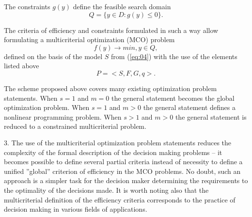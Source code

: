 \documentclass{svproc}
\begin{document}
The constraints $g(y)$ define the feasible search domain 
\begin{equation}
\label{eq:07}
Q=\{ y\in D:g(y) \leq 0 \}.
\end{equation}

The criteria of efficiency and constraints formulated in such a way allow formulating a multicriterial optimization (MCO) problem 
\begin{equation}
\label{eq:08}
f(y) \to min, y \in Q,
\end{equation}
defined on the basis of the model $S$ from (\ref{eq:04}) with the use of the elements listed above 
\begin{equation}
\label{eq:09}
P=<S,F,G,q>.
\end{equation}

The scheme proposed above covers many existing optimization problem statements. When $s=1$ and $m=0$ the general statement becomes the global optimization problem. When $s=1$ and $m>0$ the general statement defines a nonlinear programming problem. When $s>1$ and $m>0$ the general statement is reduced to a constrained multicriterial problem.

3.	The use of the multicriterial optimization problem statements reduces the complexity of the formal description of the decision making problems -- it becomes possible to define several partial criteria instead of necessity to define a unified ''global'' criterion of efficiency in the MCO problems. No doubt, such an approach is a simpler task for the decision maker determining the requirements to the optimality of the decisions made. It is worth noting also that the multicriterial definition of the efficiency criteria corresponds to the practice of decision making in various fields of applications.
\end{document}
